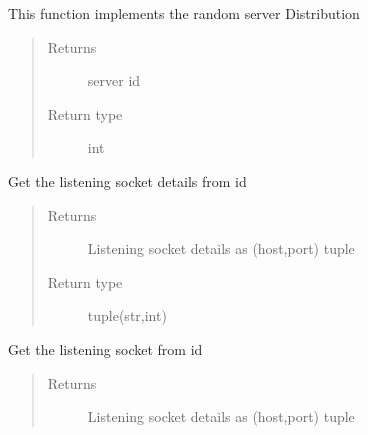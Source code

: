 \documentclass[letterpaper,10pt,english]{sphinxmanual}
\begin{document}
\begin{fulllineitems}
\begin{fulllineitems}
\label{\detokenize{lb_msg:lb_msg.LoadBalancerMessage._getRandomServer}}
This function implements the random server Distribution
\begin{quote}\begin{description}
\item[{Returns}] \leavevmode
server id

\item[{Return type}] \leavevmode
int

\end{description}\end{quote}

\end{fulllineitems}


\begin{fulllineitems}
\label{\detokenize{lb_msg:lb_msg.LoadBalancerMessage._getLsockHostPortFromID}}
Get the listening socket details from id
\begin{quote}\begin{description}
\item[{Returns}] \leavevmode
Listening socket details as (host,port) tuple

\item[{Return type}] \leavevmode
tuple(str,int)

\end{description}\end{quote}

\end{fulllineitems}


\begin{fulllineitems}
\label{\detokenize{lb_msg:lb_msg.LoadBalancerMessage._getSocketFromID}}
Get the listening socket from id
\begin{quote}\begin{description}
\item[{Returns}] \leavevmode
Listening socket details as (host,port) tuple


\end{description}
\end{quote}
\end{fulllineitems}
\end{fulllineitems}
\end{document}
